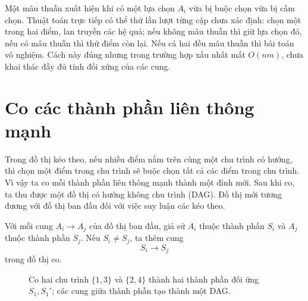 \documentclass[11pt]{article}
\begin{document}
Một mâu thuẫn xuất hiện khi có một lựa chọn $A_i$ vừa bị buộc chọn vừa
bị cấm chọn. Thuật toán trực tiếp có thể thử lần lượt từng cặp chưa xác
định: chọn một trong hai điểm, lan truyền các hệ quả; nếu không mâu
thuẫn thì giữ lựa chọn đó, nếu có mâu thuẫn thì thử điểm còn lại. Nếu
cả hai đều mâu thuẫn thì bài toán vô nghiệm. Cách này đúng nhưng trong
trường hợp xấu nhất mất $O(nm)$, chưa khai thác đầy đủ tính đối xứng
của các cung.

\section{Co các thành phần liên thông mạnh}

Trong đồ thị kéo theo, nếu nhiều điểm nằm trên cùng một chu trình có
hướng, thì chọn một điểm trong chu trình sẽ buộc chọn tất cả các điểm
trong chu trình. Vì vậy ta co mỗi thành phần liên thông mạnh thành một
đỉnh mới. Sau khi co, ta thu được một đồ thị có hướng không chu trình
(DAG). Đồ thị mới tương đương với đồ thị ban đầu đối với việc suy luận
các kéo theo.

Với mỗi cung $A_i \to A_j$ của đồ thị ban đầu, giả sử $A_i$ thuộc
thành phần $S_i$ và $A_j$ thuộc thành phần $S_j$. Nếu $S_i \ne S_j$,
ta thêm cung
\[
  S_i \to S_j
\]
trong đồ thị co.

\begin{figure}[ht]
\centering
{}
\caption{Co hai chu trình \(\{1,3\}\) và \(\{2,4\}\) thành hai thành phần đối ứng \(S_1,S_1'\); các cung giữa thành phần tạo thành một DAG.}
\end{figure}
\end{document}
